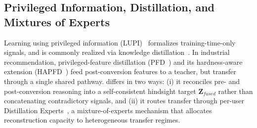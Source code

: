 \subsection{Privileged Information, Distillation, and Mixtures of Experts}
Learning using privileged information (LUPI)~\cite{vapnik2009lupi,lopezpaz2016unifying} formalizes training-time-only signals, and is commonly realized via knowledge distillation~\cite{hinton2015distill,romero2015fitnets}. In industrial recommendation, privileged-feature distillation (PFD~\cite{xu2020pfd}) and its hardness-aware extension (HAPFD~\cite{yuan2025hapfd}) feed post-conversion features to a teacher, but transfer through a single shared pathway. \modelname{} differs in two ways: (i) it reconciles pre- and post-conversion reasoning into a self-consistent hindsight target $\mathbf{Z}_{fused}$ rather than concatenating contradictory signals, and (ii) it routes transfer through per-user Distillation Experts~\cite{kang2020de}, a mixture-of-experts mechanism that allocates reconstruction capacity to heterogeneous transfer regimes.

